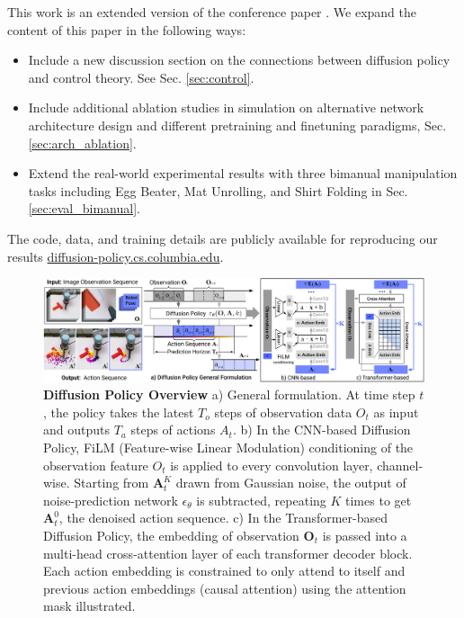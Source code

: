\documentclass[Afour,sageh,times]{sagej}
\begin{document}
This work is an extended version of the conference paper \cite{chi2023diffusionpolicy}.  We expand the content of this paper in the following ways:
\begin{itemize} %
\item Include a new discussion section on the connections between diffusion policy and control theory. See Sec. \ref{sec:control}.
\item Include additional ablation studies in simulation on alternative network architecture design and different pretraining and finetuning paradigms, Sec. \ref{sec:arch_ablation}.
\item Extend the real-world experimental results with three bimanual manipulation tasks including  Egg Beater, Mat Unrolling, and Shirt Folding in  Sec. \ref{sec:eval_bimanual}.
\end{itemize}

The code, data, and training details are publicly available for reproducing our results \url{diffusion-policy.cs.columbia.edu}.


\begin{figure}[t]
    \centering
    \includegraphics[width=\linewidth]{figure/policy_input_output.pdf}
    \caption{\textbf{Diffusion Policy Overview} \label{fig:policy_io} a) General formulation. At time step $t$, the policy takes the latest $T_o$ steps of observation data $O_t$ as input and outputs $T_a$ steps of actions $A_t$.  b) In the CNN-based Diffusion Policy, FiLM (Feature-wise Linear Modulation) \cite{perez2018film} conditioning of the observation feature $O_t$ is applied to every convolution layer, channel-wise. Starting from $\mathbf{A}^K_t$ drawn from Gaussian noise, the output of noise-prediction network $\epsilon_\theta$ is subtracted, repeating $K$ times to get $\mathbf{A}^0_t$, the denoised action sequence. c) In the Transformer-based \cite{vaswani2017attention} Diffusion Policy, the embedding of observation $\mathbf{O}_t$ is passed into a multi-head cross-attention layer of each transformer decoder block. Each action embedding is constrained to only attend to itself and previous action embeddings (causal attention) using the attention mask illustrated.  }
\end{figure}
\end{document}
